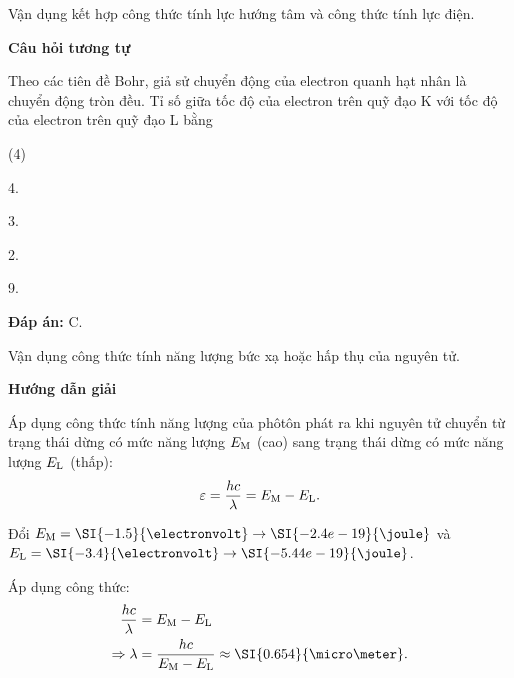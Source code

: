 \begin{dang}{Vận dụng kết hợp công thức tính lực hướng tâm và công thức tính lực điện.}
{	\begin{center}
		\textbf{Câu hỏi tương tự}
	\end{center}
	
	Theo các tiên đề Bohr, giả sử chuyển động của electron quanh hạt nhân là chuyển động tròn đều. Tỉ số giữa tốc độ của electron trên quỹ đạo K với tốc độ của electron trên quỹ đạo L bằng
	\begin{mcq}(4)
		\item 4.
		\item 3.
		\item 2.
		\item 9.
	\end{mcq}
	
	\textbf{Đáp án:} C.}
\end{dang}
\begin{dang}{Vận dụng công thức tính năng lượng bức xạ hoặc hấp thụ của nguyên tử.}
{\begin{center}
	\textbf{Hướng dẫn giải}
\end{center}

	Áp dụng công thức tính năng lượng của phôtôn phát ra khi nguyên tử chuyển từ trạng thái dừng có mức năng lượng $E_\text M$ (cao) sang trạng thái dừng có mức năng lượng $E_\text L$ (thấp): \begin{equation*}
		\varepsilon = \dfrac {hc}{\lambda} = E_\text M - E_ \text L. 
	\end{equation*}

	Đổi $E_\text M = \SI{-1.5}{\electronvolt} \rightarrow \SI{-2.4e-19}{\joule}$ và $E_\text L = \SI{-3.4}{\electronvolt} \rightarrow \SI{-5.44e-19}{\joule}$.
	
	Áp dụng công thức:
	\begin{align*}
		\dfrac{hc}{\lambda}&=E_\text M - E_ \text L \\
		\Rightarrow \lambda &= \dfrac {hc}{E_\text M - E_ \text L} \approx \SI{0.654}{\micro \meter}.
	\end{align*}
	
}
\end{dang}
